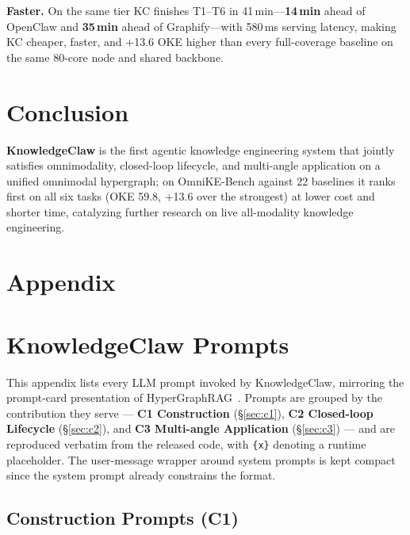 \documentclass{article}
\begin{document}
\textbf{Faster.} On the same tier KC finishes T1--T6 in 41\,min---\textbf{14\,min} ahead of OpenClaw and \textbf{35\,min} ahead of Graphify---with 580\,ms serving latency, making KC cheaper, faster, and +13.6 OKE higher than every full-coverage baseline on the same 80-core node and shared backbone.

\section{Conclusion}\label{sec:conclusion}

\textbf{KnowledgeClaw} is the first agentic knowledge engineering system that jointly satisfies omnimodality, closed-loop lifecycle, and multi-angle application on a unified omnimodal hypergraph; on OmniKE-Bench against 22 baselines it ranks first on all six tasks (OKE 59.8, +13.6 over the strongest) at lower cost and shorter time, catalyzing further research on live all-modality knowledge engineering.

\clearpage



{}




\newpage
\appendix
\section*{Appendix} 

\section{KnowledgeClaw Prompts}\label{app:prompts}

This appendix lists every LLM prompt invoked by KnowledgeClaw, mirroring the prompt-card presentation of HyperGraphRAG~\citep{HyperGraphRAG}. Prompts are grouped by the contribution they serve --- \textbf{C1 Construction} (\S\ref{sec:c1}), \textbf{C2 Closed-loop Lifecycle} (\S\ref{sec:c2}), and \textbf{C3 Multi-angle Application} (\S\ref{sec:c3}) --- and are reproduced verbatim from the released code, with \texttt{\{x\}} denoting a runtime placeholder. The user-message wrapper around system prompts is kept compact since the system prompt already constrains the format.

\subsection{Construction Prompts (C1)}
\end{document}
